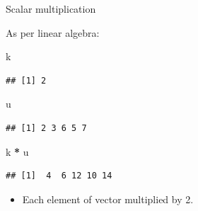 \documentclass[
  ignorenonframetext,
]{beamer}
\newenvironment{Shaded}{\begin{snugshade}}{\end{snugshade}}
\newcommand{\NormalTok}[1]{#1}
\newcommand{\OperatorTok}[1]{\textcolor[rgb]{0.81,0.36,0.00}{\textbf{#1}}}
\newcommand{\StringTok}[1]{\textcolor[rgb]{0.31,0.60,0.02}{#1}}
\providecommand{\tightlist}{%
  \setlength{\itemsep}{0pt}\setlength{\parskip}{0pt}}
\begin{document}
\begin{frame}[fragile]{Scalar multiplication}
\protect\hypertarget{scalar-multiplication}{}

As per linear algebra:

\begin{Shaded}
\begin{Highlighting}[]
\NormalTok{k}
\end{Highlighting}
\end{Shaded}

\begin{verbatim}
## [1] 2
\end{verbatim}

\begin{Shaded}
\begin{Highlighting}[]
\NormalTok{u}
\end{Highlighting}
\end{Shaded}

\begin{verbatim}
## [1] 2 3 6 5 7
\end{verbatim}

\begin{Shaded}
\begin{Highlighting}[]
\NormalTok{k }\OperatorTok{*}\StringTok{ }\NormalTok{u}
\end{Highlighting}
\end{Shaded}

\begin{verbatim}
## [1]  4  6 12 10 14
\end{verbatim}

\begin{itemize}
\tightlist
\item
  Each element of vector multiplied by 2.
\end{itemize}

\end{frame}
\end{document}
